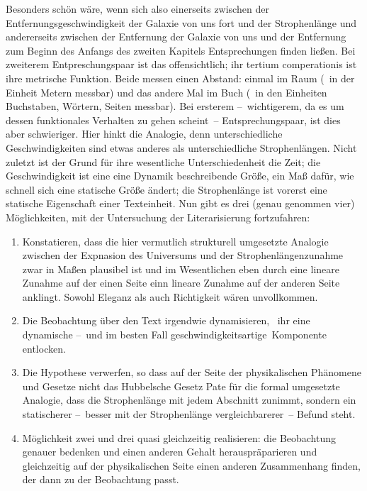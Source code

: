 Besonders schön wäre, wenn sich also einerseits zwischen der
  Entfernungsgeschwindigkeit der Galaxie von uns fort und der Strophenlänge
  und andererseits zwischen der Entfernung der Galaxie von uns und der
  Entfernung zum Beginn des Anfangs des zweiten Kapitels Entsprechungen finden
  ließen.
Bei zweiterem Entpreschungspaar ist das offensichtlich; ihr tertium
  comperationis ist ihre metrische Funktion.
  Beide messen einen Abstand: einmal im Raum (\zB\ in der Einheit Metern
  messbar) und das andere Mal im Buch (\zB\ in den Einheiten Buchstaben,
  Wörtern, Seiten messbar).
Bei ersterem --~wichtigerem, da es um dessen funktionales Verhalten zu gehen
  scheint~-- Entsprechungspaar, ist dies aber schwieriger.
Hier hinkt die Analogie, denn unterschiedliche Geschwindigkeiten sind etwas
  anderes als unterschiedliche Strophenlängen.
Nicht zuletzt ist der Grund für ihre wesentliche Unterschiedenheit die Zeit;
  die Geschwindigkeit ist eine eine Dynamik beschreibende Größe, ein Maß dafür,
  wie schnell sich eine statische Größe ändert; die Strophenlänge ist vorerst
  eine statische Eigenschaft einer Texteinheit.
  Nun gibt es drei (genau genommen vier) Möglichkeiten, mit der Untersuchung der Literarisierung
  fortzufahren:
\begin{enumerate}
  \item Konstatieren, dass die hier vermutlich strukturell umgesetzte Analogie
      zwischen der Expnasion des Universums und der Strophenlängenzunahme zwar
      in Maßen plausibel ist und im Wesentlichen eben durch eine lineare Zunahme
      auf der einen Seite einn lineare Zunahme auf der anderen Seite anklingt.
    Sowohl Eleganz als auch Richtigkeit wären unvollkommen.
  \item Die Beobachtung über den Text irgendwie \glqq dynamisieren\grqq, \dh\
    ihr eine dynamische --~und im besten Fall \glqq
    geschwindigkeitsartige\grqq\ Komponente entlocken.
  \item Die Hypothese verwerfen, so dass auf der Seite der physikalischen Phänomene
    und Gesetze nicht das Hubbelsche Gesetz Pate für die formal 
    umgesetzte Analogie, dass die Strophenlänge mit jedem Abschnitt zunimmt,
    sondern ein statischerer --~besser mit der Strophenlänge
    vergleichbarerer~-- Befund steht.
  \item Möglichkeit zwei und drei quasi gleichzeitig realisieren: die
    Beobachtung genauer bedenken und einen anderen Gehalt herauspräparieren
    und gleichzeitig auf der physikalischen Seite einen anderen Zusammenhang
    finden, der dann zu der Beobachtung passt.
\end{enumerate}

